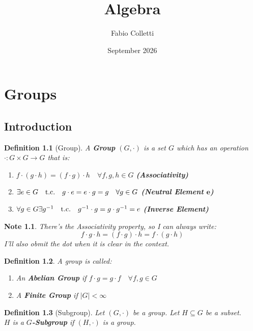 \documentclass{report}
\title{Algebra}
\author{Fabio Colletti}
\date{September 2026}
\newtheorem{defi}{Definition}
\newtheorem{note}{Note}
\begin{document}
\maketitle

\chapter{Groups}
\section{Introduction}
    \begin{defi}[Group]
        A \textbf{Group} $(G,\cdot)$ is a set $G$ which has an operation $\cdot : G \times G \rightarrow G $ that is:
        \begin{enumerate}
            \item $f\cdot (g \cdot h) = (f \cdot g) \cdot h \quad \forall f,g,h \in G$ \quad \textbf{(Associativity)}
            \item $\exists \space e \in G \quad \text{t.c.} \quad g \cdot e = e \cdot g = g \quad \forall g \in G$ \quad \textbf{(Neutral Element $\mathbf{e}$)}
            \item $\forall \space g \in G \space \exists g^{-1} \quad \text{t.c.} \quad g^{-1}\cdot g = g \cdot g^{-1} = e $ \quad \textbf{(Inverse Element)}
        \end{enumerate}
    \end{defi}\vspace{.5 cm}
    \begin{note}
        There's the Associativity property, so I can always write:
        $$f\cdot g\cdot h=(f\cdot g)\cdot h = f\cdot(g \cdot h)$$
        I'll also obmit the dot when it is clear in the context.
    \end{note}\vspace{.5 cm}
    \begin{defi}
        A group is called:
        \begin{enumerate}
            \item An \textbf{Abelian Group} if $f\cdot g = g\cdot f \quad \forall f,g \in G$
            \item A \textbf{Finite Group} if $|G| < \infty$
        \end{enumerate}
    \end{defi}\vspace{.5 cm}
    \begin{defi}[Subgroup]
        Let $(G,\cdot)$ be a group. Let $H \subseteq G$ be a subset.\\
        $H$ is a $G$\textbf{-Subgroup} if $(H,\cdot)$ is a group.
    \end{defi}\vspace{.5 cm}
\end{document}
